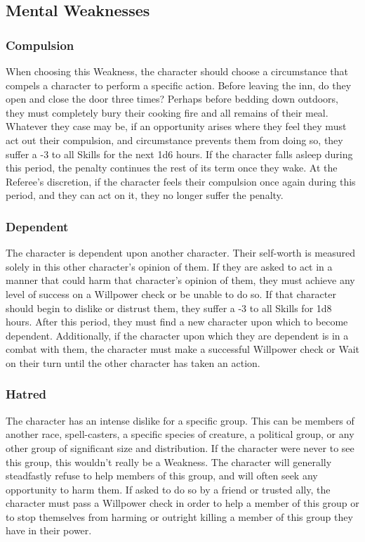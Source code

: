 \documentclass[oneside]{book}
\begin{document}
\begin{multicols}{2}
\section{Mental Weaknesses}
\subsubsection{Compulsion}
When choosing this Weakness, the character should choose a circumstance that compels a character to perform a specific action. Before leaving the inn, do they open and close the door three times? Perhaps before bedding down outdoors, they must completely bury their cooking fire and all remains of their meal. Whatever they case may be, if an opportunity arises where they feel they must act out their compulsion, and circumstance prevents them from doing so, they suffer a -3 to all Skills for the next 1d6 hours. If the character falls asleep during this period, the penalty continues the rest of its term once they wake. At the Referee's discretion, if the character feels their compulsion once again during this period, and they can act on it, they no longer suffer the penalty. 

\subsubsection{Dependent}
The character is dependent upon another character. Their self-worth is measured solely in this other character's opinion of them. If they are asked to act in a manner that could harm that character's opinion of them, they must achieve any level of success on a Willpower check or be unable to do so. If that character should begin to dislike or distrust them, they suffer a -3 to all Skills for 1d8 hours. After this period, they must find a new character upon which to become dependent. Additionally, if the character upon which they are dependent is in a combat with them, the character must make a successful Willpower check or Wait on their turn until the other character has taken an action. 

\subsubsection{Hatred}
The character has an intense dislike for a specific group. This can be members of another race, spell-casters, a specific species of creature, a political group, or any other group of significant size and distribution. If the character were never to see this group, this wouldn't really be a Weakness. The character will generally steadfastly refuse to help members of this group, and will often seek any opportunity to harm them. If asked to do so by a friend or trusted ally, the character must pass a Willpower check in order to help a member of this group or to stop themselves from harming or outright killing a member of this group they have in their power.

\end{multicols}
\end{document}
